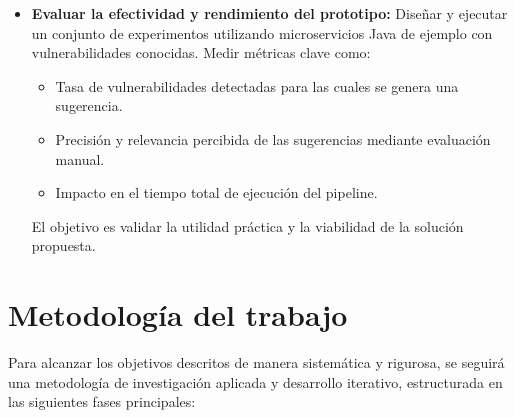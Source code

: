 \begin{itemize}
    \item \textbf{Evaluar la efectividad y rendimiento del prototipo:} Diseñar y ejecutar un conjunto de experimentos utilizando microservicios Java de ejemplo con vulnerabilidades conocidas. Medir métricas clave como:
    \begin{itemize}
        \item Tasa de vulnerabilidades detectadas para las cuales se genera una sugerencia.
        \item Precisión y relevancia percibida de las sugerencias mediante evaluación manual.
        \item Impacto en el tiempo total de ejecución del pipeline.
    \end{itemize}
    El objetivo es validar la utilidad práctica y la viabilidad de la solución propuesta.
\end{itemize}

\section{Metodología del trabajo}\label{sec:metodologia_trabajo}

Para alcanzar los objetivos descritos de manera sistemática y rigurosa, se seguirá una metodología de investigación aplicada y desarrollo iterativo, estructurada en las siguientes fases principales:

